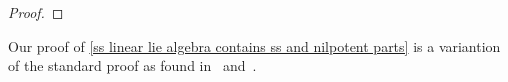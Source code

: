 \begin{proof}
%  
%   
% 
%   
%   
\end{proof}


\begin{remark}
  Our proof of \cref{ss linear lie algebra contains ss and nilpotent parts} is a variantion of the standard proof as found in~\cite[Theorem~6.4]{humphreys} and~\cite[Proposition~I.\S6.3]{bourbaki_lie}.
\end{remark}


